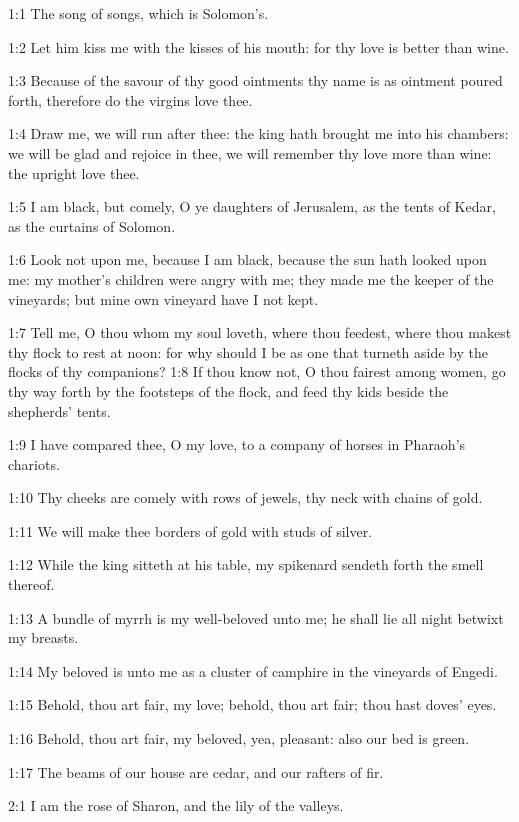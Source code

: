 

1:1 The song of songs, which is Solomon's.

1:2 Let him kiss me with the kisses of his mouth: for thy love is better than wine.

1:3 Because of the savour of thy good ointments thy name is as ointment poured forth, therefore do the virgins love thee.

1:4 Draw me, we will run after thee: the king hath brought me into his chambers: we will be glad and rejoice in thee, we will remember thy love more than wine: the upright love thee.

1:5 I am black, but comely, O ye daughters of Jerusalem, as the tents of Kedar, as the curtains of Solomon.

1:6 Look not upon me, because I am black, because the sun hath looked upon me: my mother's children were angry with me; they made me the keeper of the vineyards; but mine own vineyard have I not kept.

1:7 Tell me, O thou whom my soul loveth, where thou feedest, where thou makest thy flock to rest at noon: for why should I be as one that turneth aside by the flocks of thy companions?  1:8 If thou know not, O thou fairest among women, go thy way forth by the footsteps of the flock, and feed thy kids beside the shepherds' tents.

1:9 I have compared thee, O my love, to a company of horses in Pharaoh's chariots.

1:10 Thy cheeks are comely with rows of jewels, thy neck with chains of gold.

1:11 We will make thee borders of gold with studs of silver.

1:12 While the king sitteth at his table, my spikenard sendeth forth the smell thereof.

1:13 A bundle of myrrh is my well-beloved unto me; he shall lie all night betwixt my breasts.

1:14 My beloved is unto me as a cluster of camphire in the vineyards of Engedi.

1:15 Behold, thou art fair, my love; behold, thou art fair; thou hast doves' eyes.

1:16 Behold, thou art fair, my beloved, yea, pleasant: also our bed is green.

1:17 The beams of our house are cedar, and our rafters of fir.

2:1 I am the rose of Sharon, and the lily of the valleys.

